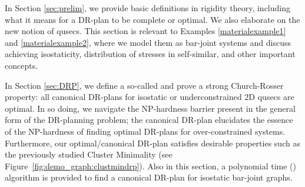 In Section \ref{sec:prelim}, we provide basic definitions in rigidity theory, including what it means for a DR-plan to be complete or optimal. We also elaborate on the new notion of qusecs.
This section is relevant to Examples \ref{materialexample1} and \ref{materialexample2}, where we model them as bar-joint systems and discuss achieving isostaticity, distribution of stresses in self-similar, and other important concepts. 



In Section \ref{sec:DRP}, we define a so-called  and prove a strong Church-Rosser property: all canonical DR-plans for isostatic or underconstrained 2D qusecs are optimal. In so doing, we navigate the NP-hardness barrier present in the general form of the DR-planning problem; the canonical DR-plan elucidates the essence of the NP-hardness of finding optimal DR-plans for over-constrained systems. Furthermore, our optimal/canonical DR-plan satisfies desirable properties such as the previously studied Cluster Minimality \cite{hoffman2001decompositionI} (see Figure~\ref{fig:demo_graph:clustmindrp}). Also in this section, a polynomial time (\candrpcomplexity) algorithm is provided to find a canonical DR-plan for isostatic bar-joint graphs.



